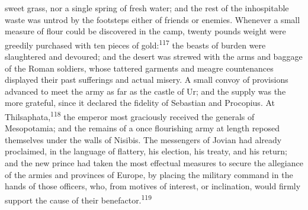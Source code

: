 sweet grass, nor a single spring of fresh water; and the rest of
the inhospitable waste was untrod by the footsteps either of
friends or enemies. Whenever a small measure of flour could be
discovered in the camp, twenty pounds weight were greedily
purchased with ten pieces of gold:\textsuperscript{117} the beasts of burden were
slaughtered and devoured; and the desert was strewed with the
arms and baggage of the Roman soldiers, whose tattered garments
and meagre countenances displayed their past sufferings and
actual misery. A small convoy of provisions advanced to meet the
army as far as the castle of Ur; and the supply was the more
grateful, since it declared the fidelity of Sebastian and
Procopius. At Thilsaphata,\textsuperscript{118} the emperor most graciously
received the generals of Mesopotamia; and the remains of a once
flourishing army at length reposed themselves under the walls of
Nisibis. The messengers of Jovian had already proclaimed, in the
language of flattery, his election, his treaty, and his return;
and the new prince had taken the most effectual measures to
secure the allegiance of the armies and provinces of Europe, by
placing the military command in the hands of those officers, who,
from motives of interest, or inclination, would firmly support
the cause of their benefactor.\textsuperscript{119}




